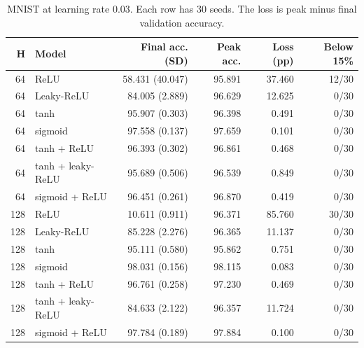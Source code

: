 \begin{table}[htbp]
\centering
\caption{MNIST at learning rate 0.03. Each row has 30 seeds. The loss is peak minus final validation accuracy.}
\label{tab:stress}
\small
\begin{tabular}{@{}rlrrrr@{}}
\toprule
H & Model & Final acc. (SD) & Peak acc. & Loss (pp) & Below 15\% \\
\midrule
64 & ReLU & 58.431 (40.047) & 95.891 & 37.460 & 12/30 \\
64 & Leaky-ReLU & 84.005 (2.889) & 96.629 & 12.625 & 0/30 \\
64 & tanh & 95.907 (0.303) & 96.398 & 0.491 & 0/30 \\
64 & sigmoid & 97.558 (0.137) & 97.659 & 0.101 & 0/30 \\
64 & tanh + ReLU & 96.393 (0.302) & 96.861 & 0.468 & 0/30 \\
64 & tanh + leaky-ReLU & 95.689 (0.506) & 96.539 & 0.849 & 0/30 \\
64 & sigmoid + ReLU & 96.451 (0.261) & 96.870 & 0.419 & 0/30 \\
128 & ReLU & 10.611 (0.911) & 96.371 & 85.760 & 30/30 \\
128 & Leaky-ReLU & 85.228 (2.276) & 96.365 & 11.137 & 0/30 \\
128 & tanh & 95.111 (0.580) & 95.862 & 0.751 & 0/30 \\
128 & sigmoid & 98.031 (0.156) & 98.115 & 0.083 & 0/30 \\
128 & tanh + ReLU & 96.761 (0.258) & 97.230 & 0.469 & 0/30 \\
128 & tanh + leaky-ReLU & 84.633 (2.122) & 96.357 & 11.724 & 0/30 \\
128 & sigmoid + ReLU & 97.784 (0.189) & 97.884 & 0.100 & 0/30 \\
\bottomrule
\end{tabular}
\end{table}
